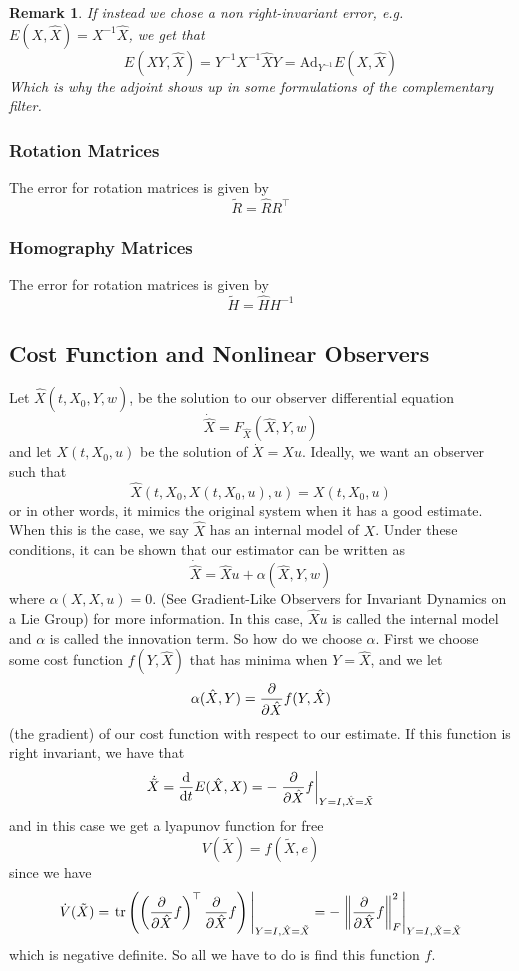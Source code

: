 \documentclass[a4paper]{article}
\newtheorem*{rem}{Remark}
\begin{document}
\begin{rem}
  If instead we chose a non right-invariant error, e.g. $E(X,\hat{X}) = X^{-1}\hat{X}$, we get that
  \[
    E(XY, \hat{X}) = Y^{-1}X^{-1}\hat{X}Y = \text{Ad}_{Y^{-1}}E(X,\hat{X})
  \]
  Which is why the adjoint shows up in some formulations of the complementary filter.
\end{rem}

\subsubsection*{Rotation Matrices}%
The error for rotation matrices is given by
\[
  \tilde{R} = \hat{R}R^\top
\]

\subsubsection*{Homography Matrices}%
The error for rotation matrices is given by
\[
  \tilde{H} = \hat{H}H^{-1}
\]

\subsection*{Cost Function and Nonlinear Observers}%
Let $ \hat{X}(t, \hat{X}_0, Y, w)$, be the solution to our observer differential equation
\[
  \dot{\hat{X}} = F_{\hat{X}}(\hat{X}, Y, w)
\]
and let $X(t, X_0, u)$ be the solution of $\dot{X} = Xu$. Ideally, we want an observer such that
\[
  \hat{X}(t, X_0, X(t, X_0, u), u) = X(t, X_0, u)
\]
or in other words, it mimics the original system when it has a good estimate. When this is the case, we say $\hat{X}$ has an internal model of $X$. Under these conditions, it can be shown that our estimator can be written as
\[
  \dot{\hat{X}} = \hat{X}u + \alpha(\hat{X}, Y, w)
\]
where $\alpha(X,X,u) = 0$. (See Gradient-Like Observers for Invariant Dynamics on a Lie Group) for more information. In this case, $\hat{X}u$ is called the internal model and $\alpha$ is called the innovation term. So how do we choose $\alpha$. First we choose some cost function $f(Y, \hat{X})$ that has minima when $Y = \hat{X}$, and we let
\[
  \alpha(\hat{X}, Y) = \pdv{}{\hat{X}} f(Y, \hat{X})
\]
(the gradient) of our cost function with respect to our estimate. If this function is right invariant, we have that
\[
  \dot{\tilde{X}} = \dv{}{t}E(\hat{X}, X) = -\eval{\pdv{}{\hat{X}}f}_{Y=I, \hat{X} = \tilde{X}}
\]
and in this case we get a lyapunov function for free
\[
  V(\tilde{X}) = f(\tilde{X}, e)
\]
since we have
\[
  \dot{V}(\tilde{X}) = \eval{\text{tr}\left( \left(\pdv{}{\hat{X}}f \right)^\top \pdv{}{\hat{X}}f\right)}_{Y=I, \hat{X} = \tilde{X}} = - \eval{\norm{\pdv{}{\hat{X}}f}_F^2}_{Y=I, \hat{X} = \tilde{X}}
\]
which is negative definite. So all we have to do is find this function $f$.
\end{document}
